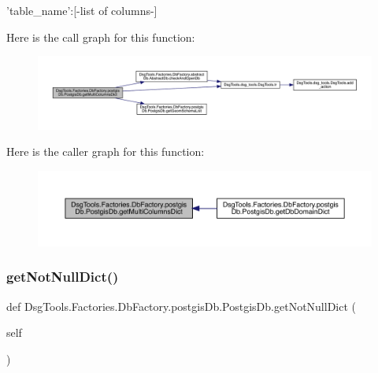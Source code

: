 \begin{DoxyVerb}{ 'table_name':[-list of columns-] } 
\end{DoxyVerb}
 Here is the call graph for this function\+:
\nopagebreak
\begin{figure}[H]
\begin{center}
\leavevmode
\includegraphics[width=350pt]{class_dsg_tools_1_1_factories_1_1_db_factory_1_1postgis_db_1_1_postgis_db_a9830b03a8fe66b790acc2d1c1c2e5f05_cgraph}
\end{center}
\end{figure}
Here is the caller graph for this function\+:
\nopagebreak
\begin{figure}[H]
\begin{center}
\leavevmode
\includegraphics[width=350pt]{class_dsg_tools_1_1_factories_1_1_db_factory_1_1postgis_db_1_1_postgis_db_a9830b03a8fe66b790acc2d1c1c2e5f05_icgraph}
\end{center}
\end{figure}
\mbox{\label{class_dsg_tools_1_1_factories_1_1_db_factory_1_1postgis_db_1_1_postgis_db_abaf725509d5d11eec8da36fbaf99e2ac}} 
\subsubsection{\texorpdfstring{get\+Not\+Null\+Dict()}{getNotNullDict()}}
{\footnotesize\ttfamily def Dsg\+Tools.\+Factories.\+Db\+Factory.\+postgis\+Db.\+Postgis\+Db.\+get\+Not\+Null\+Dict (\begin{DoxyParamCaption}\item[{}]{self }\end{DoxyParamCaption})}

